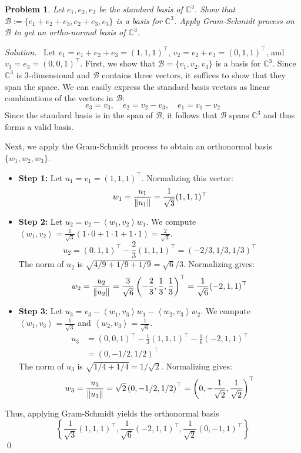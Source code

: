 \documentclass[12pt,a4paper]{article}
\newenvironment{solution}{%
  \par\noindent\textit{Solution.}\ }{\qed}
\theoremstyle{problemstyle}
\newtheorem{problem}{Problem}[section]
\def\bC{\mathbb{C}}
\newcommand{\ipp}[1]{{\left\langle{#1}\right\rangle}}
\begin{document}
\begin{problem}\label{prob:2-5}
Let $e_{1}, e_{2}, e_{3}$ be the standard basis of $\mathbb{C}^{3}$. Show that $\mathcal{B}:=\{e_{1}+e_{2}+e_{3}, e_{2}+e_{3}, e_{3}\}$ is a basis for $\mathbb{C}^{3}$. Apply Gram-Schmidt process on $\mathcal{B}$ to get an ortho-normal basis of $\mathbb{C}^{3}$.
\end{problem}
\begin{solution}
    Let $v_1 = e_1+e_2+e_3 = (1,1,1)^\top$, $v_2 = e_2+e_3 = (0,1,1)^\top$, and $v_3 = e_3 = (0,0,1)^\top$. 
    First, we show that $\mathcal{B} = \{v_1, v_2, v_3\}$ is a basis for $\bC^3$. Since $\bC^3$ is 3-dimensional and $\mathcal{B}$ contains three vectors, it suffices to show that they span the space. We can easily express the standard basis vectors as linear combinations of the vectors in $\mathcal{B}$:
    \[ e_3 = v_3, \quad e_2 = v_2 - v_3, \quad e_1 = v_1 - v_2 \]
    Since the standard basis is in the span of $\mathcal{B}$, it follows that $\mathcal{B}$ spans $\bC^3$ and thus forms a valid basis.

    Next, we apply the Gram-Schmidt process to obtain an orthonormal basis $\{w_1, w_2, w_3\}$.
    \begin{itemize}
        \item \textbf{Step 1:} Let $u_1 = v_1 = (1,1,1)^\top$. Normalizing this vector:
        \[ w_1 = \frac{u_1}{\norm{u_1}} = \frac{1}{\sqrt{3}}(1,1,1)^\top \]
        
        \item \textbf{Step 2:} Let $u_2 = v_2 - \ipp{w_1, v_2}w_1$. 
        We compute $\ipp{w_1, v_2} = \frac{1}{\sqrt{3}}(1\cdot 0 + 1\cdot 1 + 1\cdot 1) = \frac{2}{\sqrt{3}}$.
        \[ u_2 = (0,1,1)^\top - \frac{2}{3}(1,1,1)^\top = (-2/3, 1/3, 1/3)^\top \]
        The norm of $u_2$ is $\sqrt{4/9 + 1/9 + 1/9} = \sqrt{6}/3$. Normalizing gives:
        \[ w_2 = \frac{u_2}{\norm{u_2}} = \frac{3}{\sqrt{6}} \left(-\frac{2}{3}, \frac{1}{3}, \frac{1}{3}\right)^\top = \frac{1}{\sqrt{6}}(-2, 1, 1)^\top \]

        \item \textbf{Step 3:} Let $u_3 = v_3 - \ipp{w_1, v_3}w_1 - \ipp{w_2, v_3}w_2$.
        We compute $\ipp{w_1, v_3} = \frac{1}{\sqrt{3}}$ and $\ipp{w_2, v_3} = \frac{1}{\sqrt{6}}$.
        \begin{align*}
            u_3 &= (0,0,1)^\top - \frac{1}{3}(1,1,1)^\top - \frac{1}{6}(-2,1,1)^\top \\
            &= (0, -1/2, 1/2)^\top
        \end{align*}
        The norm of $u_3$ is $\sqrt{1/4 + 1/4} = 1/\sqrt{2}$. Normalizing gives:
        \[ w_3 = \frac{u_3}{\norm{u_3}} = \sqrt{2}\left(0, -1/2, 1/2\right)^\top = \left(0, -\frac{1}{\sqrt{2}}, \frac{1}{\sqrt{2}}\right)^\top \]
    \end{itemize}
    Thus, applying Gram-Schmidt yields the orthonormal basis 
    $$\left\{ \frac{1}{\sqrt{3}}(1,1,1)^\top, \frac{1}{\sqrt{6}}(-2,1,1)^\top, \frac{1}{\sqrt{2}}(0,-1,1)^\top \right\}$$
\end{solution}
\end{document}
